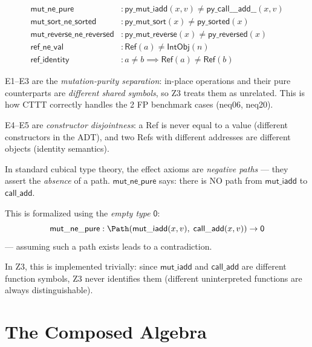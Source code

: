 \begin{definition}
\begin{align}
  \mathsf{mut\_ne\_pure} &:
    \mathsf{py\_mut\_iadd}(x, v) \neq
    \mathsf{py\_call\_\_\_add\_\_}(x, v)
    \tag{E1} \\
  \mathsf{mut\_sort\_ne\_sorted} &:
    \mathsf{py\_mut\_sort}(x) \neq \mathsf{py\_sorted}(x)
    \tag{E2} \\
  \mathsf{mut\_reverse\_ne\_reversed} &:
    \mathsf{py\_mut\_reverse}(x) \neq \mathsf{py\_reversed}(x)
    \tag{E3} \\
  \mathsf{ref\_ne\_val} &:
    \mathsf{Ref}(a) \neq \mathsf{IntObj}(n)
    \tag{E4} \\
  \mathsf{ref\_identity} &:
    a \neq b \implies \mathsf{Ref}(a) \neq \mathsf{Ref}(b)
    \tag{E5}
\end{align}
\end{definition}

E1--E3 are the \emph{mutation-purity separation}: in-place operations
and their pure counterparts are \emph{different shared symbols}, so
Z3 treats them as unrelated.  This is how CTTT correctly handles
the 2 FP benchmark cases (neq06, neq20).

E4--E5 are \emph{constructor disjointness}: a Ref is never equal to
a value (different constructors in the ADT), and two Refs with
different addresses are different objects (identity semantics).

\begin{remark}
In standard cubical type theory, the effect axioms are
\emph{negative paths} --- they assert the \emph{absence} of a path.
$\mathsf{mut\_ne\_pure}$ says: there is NO path from
$\mathsf{mut\_iadd}$ to $\mathsf{call\_add}$.

This is formalized using the \emph{empty type} $\mathsf{0}$:
\[
  \mathsf{mut\_ne\_pure} : \Path(\mathsf{mut\_iadd}(x,v),\;
    \mathsf{call\_add}(x,v)) \to \mathsf{0}
\]
--- assuming such a path exists leads to a contradiction.

In Z3, this is implemented trivially: since $\mathsf{mut\_iadd}$ and
$\mathsf{call\_add}$ are different function symbols, Z3 never
identifies them (different uninterpreted functions are always
distinguishable).
\end{remark}


\section{The Composed Algebra}

